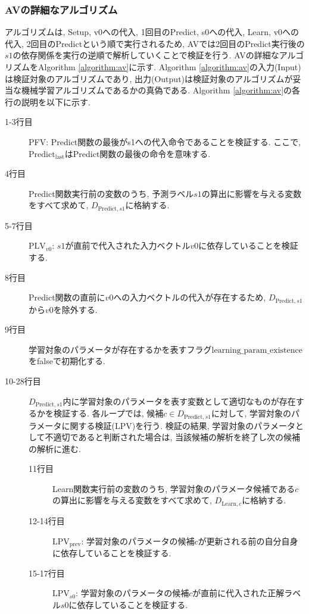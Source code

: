 \documentclass[11pt,oneside,openany,report]{jsbook}
\begin{document}
\subsubsection{AVの詳細なアルゴリズム}\label{subsubsec:mgg_automl_zero_av:suggest:av:detail}

アルゴリズムは, Setup, v0への代入, 1回目のPredict, s0への代入, Learn, v0への代入, 2回目のPredictという順で実行されるため, AVでは2回目のPredict実行後の$s1$の依存関係を実行の逆順で解析していくことで検証を行う. AVの詳細なアルゴリズムをAlgorithm \ref{algorithm:av}に示す. Algorithm \ref{algorithm:av}の入力(Input)は検証対象のアルゴリズムであり, 出力(Output)は検証対象のアルゴリズムが妥当な機械学習アルゴリズムであるかの真偽である. Algorithm \ref{algorithm:av}の各行の説明を以下に示す.

\begin{description}
  \item[1-3行目] PFV: Predict関数の最後がs1への代入命令であることを検証する. ここで, $\mathrm{Predict}_\mathrm{last}$はPredict関数の最後の命令を意味する.
  \item[4行目] Predict関数実行前の変数のうち, 予測ラベル$s1$の算出に影響を与える変数をすべて求めて, $D_{\mathrm{Predict},s1}$に格納する.
  \item[5-7行目] $\mathrm{PLV}_{v0}$: $s1$が直前で代入された入力ベクトル$v0$に依存していることを検証する.
  \item[8行目] Predict関数の直前に$v0$への入力ベクトルの代入が存在するため, $D_{\mathrm{Predict},s1}$から$v0$を除外する.
  \item[9行目] 学習対象のパラメータが存在するかを表すフラグ$\mathrm{learning\_param\_existence}$をfalseで初期化する.
  \item[10-28行目] $D_{\mathrm{Predict},s1}$内に学習対象のパラメータを表す変数として適切なものが存在するかを検証する. 各ループでは, 候補$c \in D_{\mathrm{Predict},s1}$に対して, 学習対象のパラメータに関する検証(LPV)を行う. 検証の結果, 学習対象のパラメータとして不適切であると判断された場合は, 当該候補の解析を終了し次の候補の解析に進む.
    \begin{description}
      \item[11行目] Learn関数実行前の変数のうち, 学習対象のパラメータ候補である$c$の算出に影響を与える変数をすべて求めて, $D_{\mathrm{Learn}, c}$に格納する.
      \item[12-14行目] $\mathrm{LPV}_\mathrm{prev}$: 学習対象のパラメータの候補$c$が更新される前の自分自身に依存していることを検証する.
      \item[15-17行目] $\mathrm{LPV}_{s0}$: 学習対象のパラメータの候補$c$が直前に代入された正解ラベル$s0$に依存していることを検証する.

\end{description}
\end{description}
\end{document}
